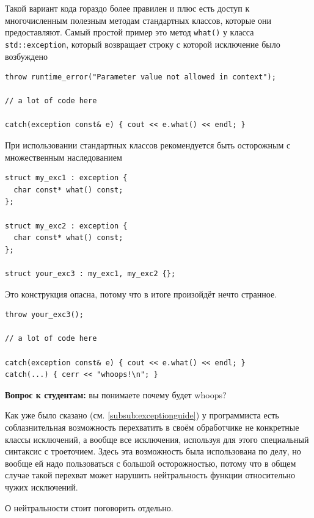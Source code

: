 \documentclass[a4paper,12pt,oneside]{book}
\newif\ifanswers
\begin{document}
Такой вариант кода гораздо более правилен и плюс есть доступ к многочисленным полезным методам стандартных классов, которые они предоставляют. Самый простой пример это метод \lstinline!what()! у класса \lstinline!std::exception!, который возвращает строку с которой исключение было возбуждено

\begin{lstlisting}
throw runtime_error("Parameter value not allowed in context");

// a lot of code here

catch(exception const& e) { cout << e.what() << endl; }
\end{lstlisting}

При использовании стандартных классов рекомендуется быть осторожным с множественным наследованием

\begin{lstlisting}
struct my_exc1 : exception {
  char const* what() const;
};

struct my_exc2 : exception {
  сhar const* what() const;
};

struct your_exc3 : my_exc1, my_exc2 {};
\end{lstlisting}

Это конструкция опасна, потому что в итоге произойдёт нечто странное.

\begin{lstlisting}
throw your_exc3();

// a lot of code here

catch(exception const& e) { cout << e.what() << endl; }
catch(...) { cerr << "whoops!\n"; }
\end{lstlisting}

\textbf{Вопрос к студентам:} вы понимаете почему будет whoops?

\ifanswers
Правильный ответ: неоднозначный выбор из двух копий верхнего базового класса. Выход разумеется в виртуальном наследовании.
\fi

Как уже было сказано (см. \ref{subsub:exceptionguide}) у программиста есть соблазнительная возможность перехватить в своём обработчике не конкретные классы исключений, а вообще все исключения, используя для этого специальный синтаксис с троеточием. Здесь эта возможность была использована по делу, но вообще ей надо пользоваться с большой осторожностью, потому что в общем случае такой перехват может нарушить нейтральность функции относительно чужих исключений.

О нейтральности стоит поговорить отдельно.
\end{document}

